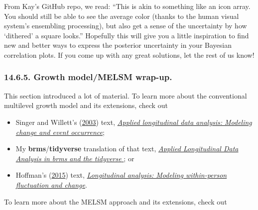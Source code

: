 \documentclass[]{article}
\providecommand{\tightlist}{%
  \setlength{\itemsep}{0pt}\setlength{\parskip}{0pt}}
\begin{document}
From Kay's GitHub repo, we read: ``This is akin to something like an
icon array. You should still be able to see the average color (thanks to
the human visual system's ensembling processing), but also get a sense
of the uncertainty by how `dithered' a square looks.'' Hopefully this
will give you a little inspiration to find new and better ways to
express the posterior uncertainty in your Bayesian correlation plots. If
you come up with any great solutions, let the rest of us know!

\hypertarget{growth-modelmelsm-wrap-up.}{%
\subsubsection{14.6.5. Growth model/MELSM
wrap-up.}\label{growth-modelmelsm-wrap-up.}}

This section introduced a lot of material. To learn more about the
conventional multilevel growth model and its extensions, check out

\begin{itemize}
\tightlist
\item
  Singer and Willett's
  (\protect\hyperlink{ref-singerAppliedLongitudinalData2003}{2003})
  text,
  \href{https://oxford.universitypressscholarship.com/view/10.1093/acprof:oso/9780195152968.001.0001/acprof-9780195152968}{\emph{Applied
  longitudinal data analysis: Modeling change and event occurrence}};
\item
  My \textbf{brms}/\textbf{tidyverse} translation of that text,
  \href{https://bookdown.org/content/4253/}{\emph{Applied Longitudinal
  Data Analysis in brms and the tidyverse }}; or
\item
  Hoffman's
  (\protect\hyperlink{ref-hoffmanLongitudinalAnalysisModeling2015}{2015})
  text,
  \href{https://www.routledge.com/Longitudinal-Analysis-Modeling-Within-Person-Fluctuation-and-Change/Hoffman/p/book/9780415876025}{\emph{Longitudinal
  analysis: Modeling within-person fluctuation and change}}.
\end{itemize}

To learn more about the MELSM approach and its extensions, check out
\end{document}
